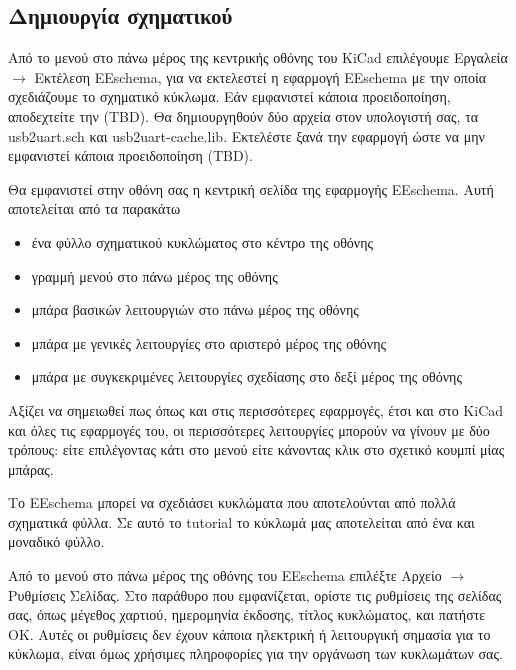 \documentclass[a4paper]{article}
\begin{document}
\subsection{Δημιουργία σχηματικού}
Από το μενού στο πάνω μέρος της κεντρικής οθόνης του \textenglish{KiCad} επιλέγουμε Εργαλεία $\rightarrow$ Εκτέλεση \textenglish{EEschema}, για να εκτελεστεί η εφαρμογή \textenglish{EEschema} με την οποία σχεδιάζουμε το σχηματικό κύκλωμα. Εάν εμφανιστεί κάποια προειδοποίηση, αποδεχτείτε την (TBD). Θα δημιουργηθούν δύο αρχεία στον υπολογιστή σας, τα usb2uart.sch και usb2uart-cache.lib. Εκτελέστε ξανά την εφαρμογή ώστε να μην εμφανιστεί κάποια προειδοποίηση (TBD).

Θα εμφανιστεί στην οθόνη σας η κεντρική σελίδα της εφαρμογής \textenglish{EEschema}. Αυτή αποτελείται από τα παρακάτω
\begin{itemize}
    \item ένα φύλλο σχηματικού κυκλώματος στο κέντρο της οθόνης
    \item γραμμή μενού στο πάνω μέρος της οθόνης
    \item μπάρα βασικών λειτουργιών στο πάνω μέρος της οθόνης
    \item μπάρα με γενικές λειτουργίες στο αριστερό μέρος της οθόνης
    \item μπάρα με συγκεκριμένες λειτουργίες σχεδίασης στο δεξί μέρος της οθόνης
\end{itemize}
Αξίζει να σημειωθεί πως όπως και στις περισσότερες εφαρμογές, έτσι και στο \textenglish{KiCad} και όλες τις εφαρμογές του, οι περισσότερες λειτουργίες μπορούν να γίνουν με δύο τρόπους: είτε επιλέγοντας κάτι στο μενού είτε κάνοντας κλικ στο σχετικό κουμπί μίας μπάρας.

\begin{figure}
  \begin{center}
    \label{fig:kicad-main}
  \end{center}
\end{figure}

Το \textenglish{EEschema} μπορεί να σχεδιάσει κυκλώματα που αποτελούνται από πολλά σχηματικά φύλλα. Σε αυτό το tutorial το κύκλωμά μας αποτελείται από ένα και μοναδικό φύλλο.

Από το μενού στο πάνω μέρος της οθόνης του \textenglish{EEschema} επιλέξτε Αρχείο $\rightarrow$ Ρυθμίσεις Σελίδας. Στο παράθυρο που εμφανίζεται, ορίστε τις ρυθμίσεις της σελίδας σας, όπως μέγεθος χαρτιού, ημερομηνία έκδοσης, τίτλος κυκλώματος, και πατήστε ΟΚ. Αυτές οι ρυθμίσεις δεν έχουν κάποια ηλεκτρική ή λειτουργική σημασία για το κύκλωμα, είναι όμως χρήσιμες πληροφορίες για την οργάνωση των κυκλωμάτων σας.
\end{document}
